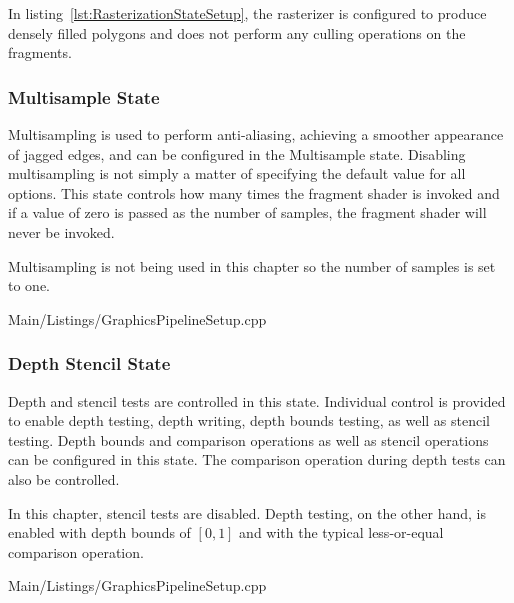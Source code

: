 
        In listing~\ref{lst:RasterizationStateSetup}, the rasterizer is configured to produce densely filled polygons and does not perform any culling operations on the fragments.

      \subsubsection{Multisample State}
        \label{sss:MultisampleState}
        Multisampling is used to perform anti-aliasing, achieving a smoother appearance of jagged edges, and can be configured in the Multisample state.
        Disabling multisampling is not simply a matter of specifying the default value for all options.
        This state controls how many times the fragment shader is invoked and if a value of zero is passed as the number of samples, the fragment shader will never be invoked.

        Multisampling is not being used in this chapter so the number of samples is set to one.

        
        {Main/Listings/GraphicsPipelineSetup.cpp}

      \subsubsection{Depth Stencil State}
        Depth and stencil tests are controlled in this state.
        Individual control is provided to enable depth testing, depth writing, depth bounds testing, as well as stencil testing.
        Depth bounds and comparison operations as well as stencil operations can be configured in this state.
        The comparison operation during depth tests can also be controlled.

        In this chapter, stencil tests are disabled.
        Depth testing, on the other hand, is enabled with depth bounds of $[0, 1]$ and with the typical less-or-equal comparison operation.

        
        {Main/Listings/GraphicsPipelineSetup.cpp}

